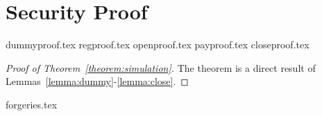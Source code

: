 \section{Security Proof}
  \label{appendix:secproof}
  {dummyproof.tex}
  {regproof.tex}
  {openproof.tex}
  {payproof.tex}
  {closeproof.tex}

  \begin{proof}[Proof of Theorem~\ref{theorem:simulation}]
    The theorem is a direct result of
    Lemmas~\ref{lemma:dummy}-\ref{lemma:close}.
  \end{proof}

  {forgeries.tex}
